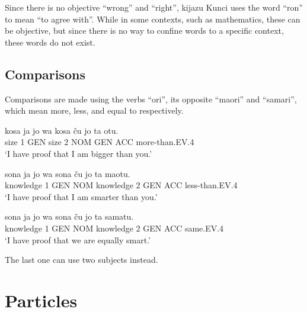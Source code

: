 \documentclass{clgrammar}
\begin{document}
Since there is no objective ``wrong'' and ``right'', kijazu Kunci uses the word ``ron'' to mean ``to agree with''. While in some contexts, such as mathematics, these can be objective, but since there is no way to confine words to a specific context, these words do not exist. 

\section{Comparisons}

Comparisons are made using the verbs ``ori'', its opposite ``maori'' and ``samari'', which mean more, less, and equal to respectively.

\begin{exe}
	\ex
	\gll kosa ja jo wa kosa ču jo ta otu.\\
	size 1 GEN size 2 NOM GEN ACC more-than.EV.4 \\
	\trans `I have proof that I am bigger than you.'
\end{exe}

\begin{exe}
	\ex
	\gll sona ja jo wa sona ču jo ta maotu.\\
	knowledge 1 GEN NOM knowledge 2 GEN ACC less-than.EV.4 \\
	\trans `I have proof that I am smarter than you.'
\end{exe}

\begin{exe}
	\ex
	\gll sona ja jo wa sona ču jo ta samatu.\\
	knowledge 1 GEN NOM knowledge 2 GEN ACC same.EV.4 \\
	\trans `I have proof that we are equally smart.'
\end{exe}

The last one can use two subjects instead.



\chapter{Particles}
\end{document}
